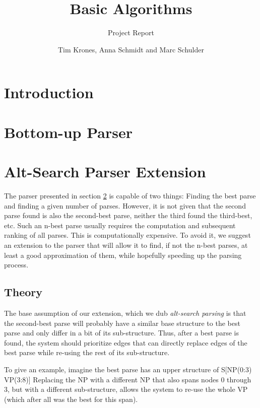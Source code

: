 \documentclass[11pt, titlepage, a4paper]{scrartcl}		%
\newcommand{\xmas}[1]{alt-search#1}
\newcommand{\XMas}[1]{Alt-Search#1}
\begin{document}
\title{Basic Algorithms}
\subtitle{Project Report}
\author{Tim Krones, Anna Schmidt and Marc Schulder}
\maketitle

\section{Introduction}
\label{sec:intro}


\section{Bottom-up Parser}
\label{sec:basic}


\section{\XMas{} Parser Extension}
\label{sec:alt}
The parser presented in section \ref{sec:basic} is capable of two things: Finding the best parse and finding a given number of parses. However, it is not given that the second parse found is also the second-best parse, neither the third found the third-best, etc. Such an n-best parse usually requires the computation and subsequent ranking of all parses.
This is computationally expensive. To avoid it, we suggest an extension to the parser that will allow it to find, if not the n-best parses, at least a good approximation of them, while hopefully speeding up the parsing process.

\subsection{Theory}
\label{sec:alt:theory}
The base assumption of our extension, which we dub \textit{\xmas{} parsing} is that the second-best parse will probably have a similar base structure to the best parse and only differ in a bit of its sub-structure.
Thus, after a best parse is found, the system should prioritize edges that can directly replace edges of the best parse while re-using the rest of its sub-structure.

To give an example, imagine the best parse has an upper structure of S[NP(0:3) VP(3:8)]
Replacing the NP with a different NP that also spans nodes 0 through 3, but with a different sub-structure, allows the system to re-use the whole VP (which after all was the best for this span).
\end{document}
